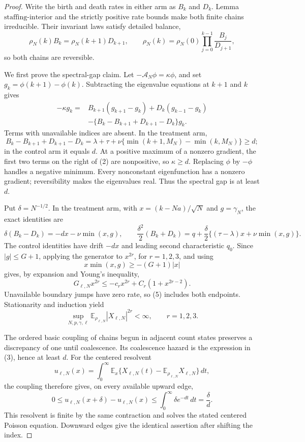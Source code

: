 \documentclass{article}
\begin{document}
\begin{proof}
Write the birth and death rates in either arm as \(B_k\) and \(D_k\).  Lemma \(\mathrm{staffing\mbox{-}interior}\) and the strictly positive rate bounds make both finite chains irreducible.  Their invariant laws satisfy detailed balance,
\[
 \rho_N(k)B_k=\rho_N(k+1)D_{k+1},
 \qquad
 \rho_N(k)=\rho_N(0)\prod_{j=0}^{k-1}\frac{B_j}{D_{j+1}},    \tag{1}
\]
so both chains are reversible.

We first prove the spectral-gap claim.  Let \(-\mathcal A_N\phi=\kappa\phi\), and set \(g_k=\phi(k+1)-\phi(k)\).  Subtracting the eigenvalue equations at \(k+1\) and \(k\) gives
\[
 \begin{split}
 -\kappa g_k={}&B_{k+1}(g_{k+1}-g_k)+D_k(g_{k-1}-g_k)\\
 &-\{B_k-B_{k+1}+D_{k+1}-D_k\}g_k.                            \tag{2}
 \end{split}
\]
Terms with unavailable indices are absent.  In the treatment arm,
\[
 B_k-B_{k+1}+D_{k+1}-D_k
 =\lambda+\tau+\nu\{\min(k+1,M_N)-\min(k,M_N)\}\geq d;       \tag{3}
\]
in the control arm it equals \(d\).  At a positive maximum of a nonzero gradient, the first two terms on the right of (2) are nonpositive, so \(\kappa\geq d\).  Replacing \(\phi\) by \(-\phi\) handles a negative minimum.  Every nonconstant eigenfunction has a nonzero gradient; reversibility makes the eigenvalues real.  Thus the spectral gap is at least \(d\).

Put \(\delta=N^{-1/2}\).  In the treatment arm, with \(x=(k-Na)/\sqrt N\) and \(g=\gamma_N\), the exact identities are
\[
 \delta(B_k-D_k)=-dx-\nu\min(x,g),
 \qquad
 \frac{\delta^2}{2}(B_k+D_k)
 =q+\frac\delta2\{(\tau-\lambda)x+\nu\min(x,g)\}.            \tag{4}
\]
The control identities have drift \(-dx\) and leading second characteristic \(q_0\).  Since \(|g|\leq G+1\), applying the generator to \(x^{2r}\), for \(r=1,2,3\), and using
\[
 x\min(x,g)\geq-(G+1)|x|
\]
gives, by expansion and Young's inequality,
\[
 G_{\ell,N}x^{2r}\leq-c_r x^{2r}+C_r(1+x^{2r-2}).             \tag{5}
\]
Unavailable boundary jumps have zero rate, so (5) includes both endpoints.  Stationarity and induction yield
\[
 \sup_{N,p,\gamma,\ell}
 \mathbb E_{\rho_{\ell,N}}|X_{\ell,N}|^{2r}<\infty,
 \qquad r=1,2,3.                                               \tag{6}
\]

The ordered basic coupling of chains begun in adjacent count states preserves a discrepancy of one until coalescence.  Its coalescence hazard is the expression in (3), hence at least \(d\).  For the centered resolvent
\[
 u_{\ell,N}(x)=\int_0^\infty
 \mathbb E_x\{X_{\ell,N}(t)-\mathbb E_{\rho_{\ell,N}}X_{\ell,N}\}\,dt,
\]
the coupling therefore gives, on every available upward edge,
\[
 0\leq u_{\ell,N}(x+\delta)-u_{\ell,N}(x)
 \leq\int_0^\infty\delta e^{-dt}\,dt=\frac\delta d.          \tag{7}
\]
This resolvent is finite by the same contraction and solves the stated centered Poisson equation.  Downward edges give the identical assertion after shifting the index.


\end{proof}
\end{document}
